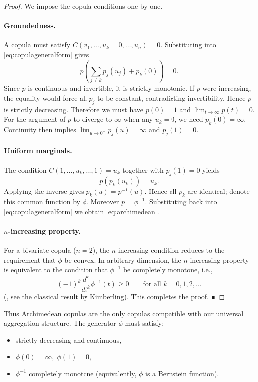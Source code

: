 \begin{proof}
We impose the copula conditions one by one.

\paragraph{Groundedness.} A copula must satisfy \(C(u_1,\ldots,u_k=0,\ldots,u_n)=0\). Substituting into \eqref{eq:copulageneralform} gives
\[
p\!\left(\sum_{j\neq k} p_j(u_j)+p_k(0)\right)=0.
\]
Since \(p\) is continuous and invertible, it is strictly monotonic. If \(p\) were increasing, the equality would force all \(p_j\) to be constant, contradicting invertibility. Hence \(p\) is strictly decreasing. Therefore we must have \(p(0)=1\) and \(\lim_{t\to\infty}p(t)=0\). For the argument of \(p\) to diverge to \(\infty\) when any \(u_k=0\), we need \(p_k(0)=\infty\). Continuity then implies \(\lim_{u\to0^+}p_j(u)=\infty\) and \(p_j(1)=0\).

\paragraph{Uniform marginals.} The condition \(C(1,\ldots,u_k,\ldots,1)=u_k\) together with \(p_j(1)=0\) yields
\[
p(p_k(u_k))=u_k.
\]
Applying the inverse gives \(p_k(u)=p^{-1}(u)\). Hence all \(p_k\) are identical; denote this common function by \(\phi\). Moreover \(p=\phi^{-1}\). Substituting back into \eqref{eq:copulageneralform} we obtain \eqref{eq:archimedean}.

\paragraph{\(n\)-increasing property.} For a bivariate copula (\(n=2\)), the \(n\)-increasing condition reduces to the requirement that \(\phi\) be convex. In arbitrary dimension, the \(n\)-increasing property is equivalent to the condition that \(\phi^{-1}\) be completely monotone, i.e.,
\[
(-1)^k\frac{d^k}{dt^k}\phi^{-1}(t)\ge 0\qquad\text{for all }k=0,1,2,\ldots
\]
(\cite{kimberling1974probabilistic}, see the classical result by Kimberling). This completes the proof. ∎
\end{proof}

Thus Archimedean copulas are the only copulas compatible with our universal aggregation structure. The generator \(\phi\) must satisfy:
\begin{itemize}
\item strictly decreasing and continuous,
\item \(\phi(0)=\infty,\;\phi(1)=0\),
\item \(\phi^{-1}\) completely monotone (equivalently, \(\phi\) is a Bernstein function).
\end{itemize}

